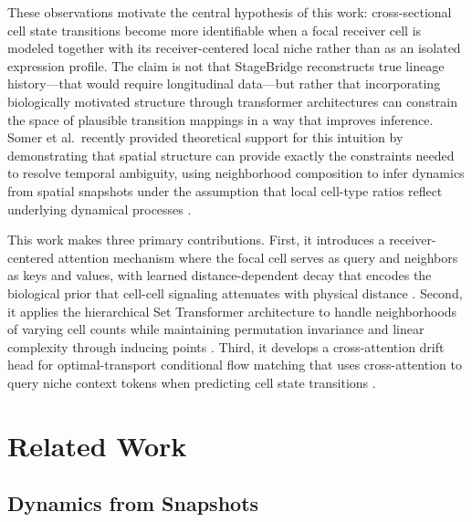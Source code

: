 \documentclass[conference]{IEEEtran}
\begin{document}
These observations motivate the central hypothesis of this work: cross-sectional cell state transitions become more identifiable when a focal receiver cell is modeled together with its receiver-centered local niche rather than as an isolated expression profile. The claim is not that StageBridge reconstructs true lineage history---that would require longitudinal data---but rather that incorporating biologically motivated structure through transformer architectures can constrain the space of plausible transition mappings in a way that improves inference. Somer et al.\ recently provided theoretical support for this intuition by demonstrating that spatial structure can provide exactly the constraints needed to resolve temporal ambiguity, using neighborhood composition to infer dynamics from spatial snapshots under the assumption that local cell-type ratios reflect underlying dynamical processes \cite{Somer2026-ma}.

This work makes three primary contributions. First, it introduces a receiver-centered attention mechanism where the focal cell serves as query and neighbors as keys and values, with learned distance-dependent decay that encodes the biological prior that cell-cell signaling attenuates with physical distance \cite{Hong2025-jm}. Second, it applies the hierarchical Set Transformer architecture to handle neighborhoods of varying cell counts while maintaining permutation invariance and linear complexity through inducing points \cite{Lee2018-ya}. Third, it develops a cross-attention drift head for optimal-transport conditional flow matching that uses cross-attention to query niche context tokens when predicting cell state transitions \cite{Lipman2022-ns, Klein2025-sr}.

\section{Related Work}

\subsection{Dynamics from Snapshots}
\end{document}
